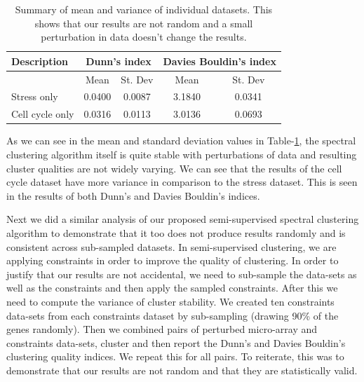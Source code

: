 \begin{table}
\centering
\begin{tabular}{|l|c|c|c|c|}
\hline
Description & \multicolumn{2}{|c|}{Dunn's index}  & \multicolumn{2}{|c|}{Davies Bouldin's index}\\
\hline
 & Mean & St. Dev & Mean & St. Dev\\
\hline
Stress only  & 0.0400 & 0.0087 & 3.1840 & 0.0341 \\
Cell cycle only & 0.0316 & 0.0113 & 3.0136 & 0.0693 \\
\hline 
\end{tabular}
\caption{Summary of mean and variance of individual datasets. This shows that our results are not random and a small perturbation in data doesn't change the results.}
\label{tab:stress_ccycle_perturb}
\end{table}

As we can see in the mean and standard deviation values in Table-\ref{tab:stress_ccycle_perturb}, the spectral clustering algorithm itself is quite stable with perturbations of 
data and resulting cluster qualities are not widely varying. We can see that the results of the cell cycle dataset have more variance in comparison to the stress dataset. 
This is seen in the results of both Dunn's and Davies Bouldin's indices.

Next we did a similar analysis of our proposed semi-supervised spectral clustering algorithm to demonstrate that it too does not produce results randomly and is consistent across 
sub-sampled datasets. In semi-supervised clustering, we are applying constraints in order to improve the quality 
of clustering. In order to justify that our results are not accidental, we need to sub-sample the data-sets as well as the constraints and then apply the sampled constraints. After this we need to compute the 
variance of cluster stability. We created ten constraints data-sets from each constraints dataset by sub-sampling (drawing 90\% of the genes randomly). Then we combined pairs of 
perturbed micro-array and constraints data-sets, cluster and then report the Dunn's and Davies Bouldin's clustering quality indices. We repeat this for all pairs. 
To reiterate, this was to demonstrate that our results are not random and that they are statistically valid.

